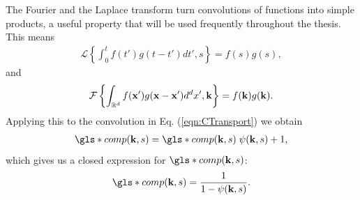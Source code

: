 The Fourier and the Laplace transform turn convolutions of functions into simple products, a useful property that will be used frequently throughout the thesis. This means
%
\begin{align}
\mathcal{L} \left\{ \int_{0}^{t} f(t') g(t-t') dt', s \right\} = f(s) g(s)  \label{eqn:LConvolution} ,
\end{align}
%
and 
%
\begin{align}
\mathcal{F} \left\{ \int_{\mathbb{R}^{d}} f(\mathbf{ x }') g(\mathbf{ x } - \mathbf{ x }') d^{d}x' , \mathbf{ k } \right\} = f(\mathbf{ k }) g(\mathbf{ k })  \label{eqn:FConvolution} .
\end{align}
%
Applying this to the convolution in Eq. (\ref{eqn:CTransport}) we obtain 
%
\begin{align}
\gls*{comp}(\ve{k},s) =  \gls*{comp}(\ve{k},s)  \; \psi(\ve{k},s) + 1 ,
\end{align}
%
which gives us a closed expression for $\gls*{comp}(\ve{k},s)$: 
%
\begin{align}
\gls*{comp}(\ve{k},s) = \frac{1}{1 - \psi(\ve{k},s)} \label{eqn:CFourierLaplace} .
\end{align}

